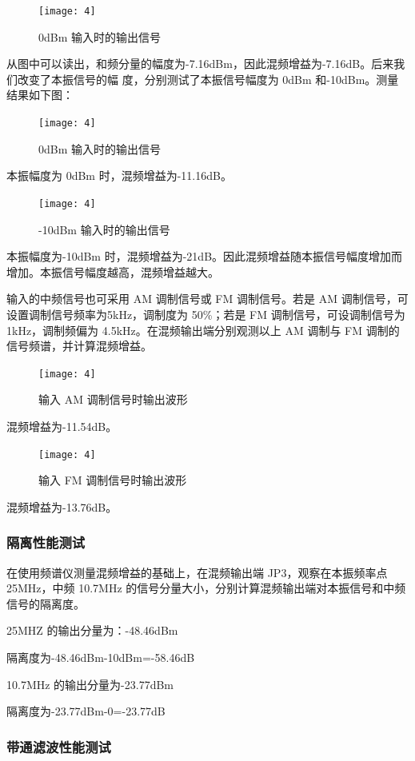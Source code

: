 \documentclass{../source/Experiment}
\begin{document}
\begin{figure}[H]
    \centering
    \texttt{[image: 4]}
    \caption{ 0dBm 输入时的输出信号}
\end{figure}
从图中可以读出，和频分量的幅度为-7.16dBm，因此混频增益为-7.16dB。后来我们改变了本振信号的幅
度，分别测试了本振信号幅度为 0dBm 和-10dBm。测量结果如下图：
\begin{figure}[H]
    \centering
    \texttt{[image: 4]}
    \caption{0dBm 输入时的输出信号}
\end{figure}

本振幅度为 0dBm 时，混频增益为-11.16dB。

\begin{figure}[H]
    \centering
    \texttt{[image: 4]}
    \caption{-10dBm 输入时的输出信号}
\end{figure}

本振幅度为-10dBm 时，混频增益为-21dB。因此混频增益随本振信号幅度增加而增加。本振信号幅度越高，混频增益越大。

输入的中频信号也可采用 AM 调制信号或 FM 调制信号。若是 AM 调制信号，可设置调制信号频率为5kHz，调制度为 50\%；若是 FM 调制信号，可设调制信号为 1kHz，调制频偏为 4.5kHz。在混频输出端分别观测以上 AM 调制与 FM 调制的信号频谱，并计算混频增益。

\begin{figure}[H]
    \centering
    \texttt{[image: 4]}
    \caption{输入 AM 调制信号时输出波形}
\end{figure}

混频增益为-11.54dB。

\begin{figure}[H]
    \centering
    \texttt{[image: 4]}
    \caption{输入 FM 调制信号时输出波形}
\end{figure}
混频增益为-13.76dB。
\subsubsection{隔离性能测试}
在使用频谱仪测量混频增益的基础上，在混频输出端 JP3，观察在本振频率点 25MHz，中频 10.7MHz 的信号分量大小，分别计算混频输出端对本振信号和中频信号的隔离度。

25MHZ 的输出分量为：-48.46dBm

隔离度为-48.46dBm-10dBm=-58.46dB

10.7MHz 的输出分量为-23.77dBm

隔离度为-23.77dBm-0=-23.77dB

\subsubsection{带通滤波性能测试}
\end{document}
